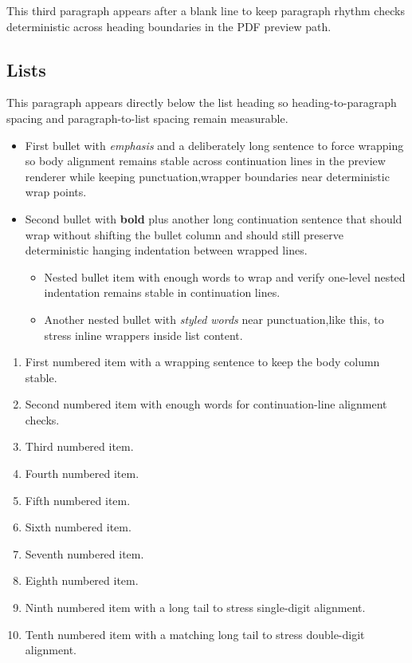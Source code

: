 \documentclass{article}
\begin{document}
This third paragraph appears after a blank line to keep paragraph rhythm checks deterministic across heading boundaries in the PDF preview path.

\subsection{Lists}
This paragraph appears directly below the list heading so heading-to-paragraph spacing and paragraph-to-list spacing remain measurable.

\begin{itemize}
\item First bullet with \emph{emphasis} and a deliberately long sentence to force wrapping so body alignment remains stable across continuation lines in the preview renderer while keeping punctuation,wrapper boundaries near deterministic wrap points.
\item Second bullet with \textbf{bold} plus another long continuation sentence that should wrap without shifting the bullet column and should still preserve deterministic hanging indentation between wrapped lines.
\begin{itemize}
\item Nested bullet item with enough words to wrap and verify one-level nested indentation remains stable in continuation lines.
\item Another nested bullet with \emph{styled words} near punctuation,like this, to stress inline wrappers inside list content.
\end{itemize}
\end{itemize}

\begin{enumerate}
\item First numbered item with a wrapping sentence to keep the body column stable.
\item Second numbered item with enough words for continuation-line alignment checks.
\item Third numbered item.
\item Fourth numbered item.
\item Fifth numbered item.
\item Sixth numbered item.
\item Seventh numbered item.
\item Eighth numbered item.
\item Ninth numbered item with a long tail to stress single-digit alignment.
\item Tenth numbered item with a matching long tail to stress double-digit alignment.
\end{enumerate}
\end{document}
